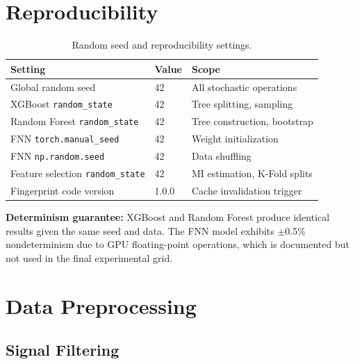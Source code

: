 \section{Reproducibility}
\label{sec:app_reproducibility}

\begin{table}[h]
\centering
\caption{Random seed and reproducibility settings.}
\label{tab:reproducibility}
\begin{tabular}{l l l}
\toprule
\textbf{Setting} & \textbf{Value} & \textbf{Scope} \\
\midrule
Global random seed         & 42    & All stochastic operations \\
XGBoost \texttt{random\_state}   & 42    & Tree splitting, sampling \\
Random Forest \texttt{random\_state} & 42 & Tree construction, bootstrap \\
FNN \texttt{torch.manual\_seed}  & 42    & Weight initialization \\
FNN \texttt{np.random.seed}      & 42    & Data shuffling \\
Feature selection \texttt{random\_state} & 42 & MI estimation, K-Fold splits \\
Fingerprint code version   & 1.0.0 & Cache invalidation trigger \\
\bottomrule
\end{tabular}
\end{table}

\textbf{Determinism guarantee:} XGBoost and Random Forest produce identical results given the same seed and data. The FNN model exhibits $\pm$0.5\% nondeterminism due to GPU floating-point operations, which is documented but not used in the final experimental grid.

\section{Data Preprocessing}
\label{sec:app_preprocessing}

\subsection{Signal Filtering}

